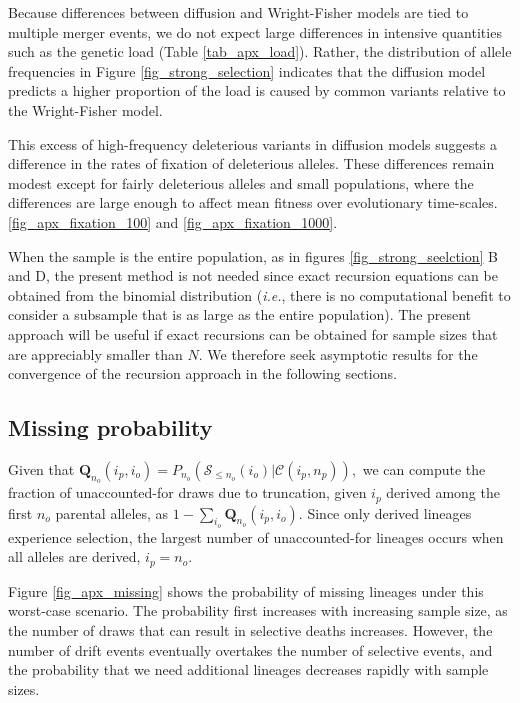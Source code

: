 \documentclass[review,nonatbib]{elsarticle}
\begin{document}
Because differences between diffusion and Wright-Fisher models are tied to multiple merger events, 
we do not expect large differences in intensive quantities such as the genetic load 
(Table \ref{tab_apx_load}). Rather, the distribution of allele frequencies in Figure \ref{fig_strong_selection}
 indicates that the diffusion model predicts a higher proportion of the load is caused by common variants 
relative to the Wright-Fisher model. 

This excess of high-frequency deleterious variants in diffusion models suggests a difference 
in the rates of fixation of deleterious alleles. 
These differences remain modest except for fairly deleterious alleles and small populations,
where the differences are large enough to affect mean fitness over evolutionary time-scales. 
\ref{fig_apx_fixation_100} and \ref{fig_apx_fixation_1000}.

When the sample is the entire population, as in figures \ref{fig_strong_seelction} B and D, the
present method is not needed since exact recursion equations can be obtained from the binomial
distribution (\textit{i.e.}, there is no computational benefit to consider a subsample that is as
large as the entire population).  The present approach will be useful if exact recursions can be
obtained for sample sizes that are appreciably smaller than $N$. We therefore seek asymptotic
results for the convergence of the recursion approach in the following sections.

\subsection{Missing probability}
\label{subsec_missing}


Given that $ \mathbf{Q}_{n_o}(i_p, i_o) = P_{n_o}(\mathcal{S}_{\leq n_o} (i_o)|
\mathcal{C}(i_p,n_p)),$ we can compute the fraction of unaccounted-for draws due to truncation,
given $i_p$ derived among the first $n_o$ parental alleles, as $1-\sum_{i_o} \mathbf{Q}_{n_o}(i_p,
i_o).$ Since only derived lineages experience selection, the largest number of unaccounted-for
 lineages occurs when all alleles are derived, $i_p= n_o$.

Figure \ref{fig_apx_missing} shows the probability of missing lineages under this worst-case
scenario. The probability first increases with increasing sample size, as the number of draws that
can result in selective deaths increases. However, the number of drift events eventually overtakes
the number of selective events, and the probability that we need additional lineages decreases
rapidly with sample sizes. %
\end{document}
